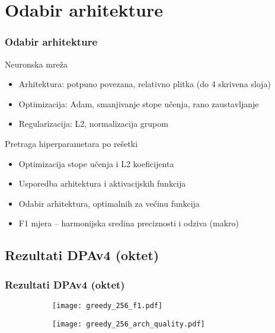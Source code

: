 \documentclass{beamer}
\begin{document}
\section{Odabir arhitekture} 

\begin{frame}
\frametitle{Odabir arhitekture}

Neuronska mreža

\begin{itemize}
\item Arhitektura: potpuno povezana, relativno plitka (do 4 skrivena sloja)
\item Optimizacija: Adam, smanjivanje stope učenja, rano zaustavljanje
\item Regularizacija: L2, normalizacija grupom
\end{itemize}

Pretraga hiperparametara po rešetki

\begin{itemize}
\item Optimizacija stope učenja i L2 koeficijenta
\item Usporedba arhitektura i aktivacijskih funkcija
\item Odabir arhitektura, optimalnih za većinu funkcija
\item F1 mjera -- harmonijska sredina preciznosti i odziva (makro)
\end{itemize}
\end{frame}

\subsection{Rezultati DPAv4 (oktet)}

\begin{frame}
\frametitle{Rezultati DPAv4 (oktet)}

\begin{figure}
\centering
\begin{subfigure}{.48\textwidth}
  \centering
  \texttt{[image: greedy\_256\_f1.pdf]}
\end{subfigure}
\begin{subfigure}{.5\textwidth}
  \centering
  \texttt{[image: greedy\_256\_arch\_quality.pdf]}
\end{subfigure}
\end{figure}

\end{frame}
\end{document}
